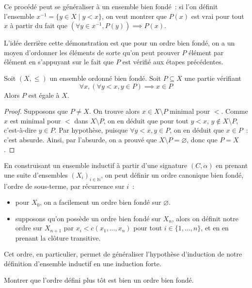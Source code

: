 Ce procédé peut se généraliser à un ensemble bien fondé~: si l'on définit
l'ensemble
$x^{-1} = \{y \in X \mid y < x\}$, on veut montrer que $P(x)$ est vrai pour tout
$x$ à partir du fait que $(\forall y \in x^{-1}, P(y)) \implies P(x)$.

L'idée derrière cette démonstration est que pour un ordre bien fondé, on a un
moyen d'ordonner les éléments de sorte qu'on peut prouver $P$ élément par
élément en s'appuyant sur le fait que $P$ est vérifié aux étapes précédentes.

\begin{theorem}
  Soit $(X,\leq)$ un ensemble ordonné bien fondé. Soit $P\subseteq X$ une partie
  vérifiant
  \[\forall x, (\forall y < x, y\in P) \implies x\in P\]
  Alors $P$ est égale à $X$.
\end{theorem}

\begin{proof}
  Supposons que $P\neq X$. On trouve alors $x\in X \setminus P$ minimal pour
  $<$. Comme $x$ est minimal pour $<$ dans $X\setminus P$, on en déduit que pour
  tout $y < x$, $y \notin X\setminus P$, c'est-à-dire $y\in P$. Par hypothèse,
  puisque $\forall y < x, y\in P$, on en déduit que $x\in P$~: c'est absurde.
  Ainsi, par l'absurde, on a prouvé que $X\setminus P = \varnothing$, donc que
  $P = X$.
\end{proof}

\begin{remark}
  En construisant un ensemble inductif à partir d'une signature $(C,\alpha)$ en
  prenant une suite d'ensembles $(X_i)_{i\in \mathbb N}$, on peut définir un ordre
  canonique bien fondé, l'ordre de sous-terme, par récurrence sur $i$~:
  \begin{itemize}
  \item pour $X_0$, on a facilement un ordre bien fondé sur $\varnothing$.
  \item supposons qu'on possède un ordre bien fondé sur $X_n$, alors on définit
    notre ordre sur $X_{n+1}$ par $x_i < c(x_1,\ldots,x_n)$ pour tout
    $i \in \{1,\ldots,n\}$, et en en prenant la clôture transitive.
  \end{itemize}

  Cet ordre, en particulier, permet de généraliser l'hypothèse d'induction de
  notre définition d'ensemble inductif en une induction forte.
\end{remark}

\begin{exercise}
  Montrer que l'ordre défini plus tôt est bien un ordre bien fondé.
\end{exercise}

